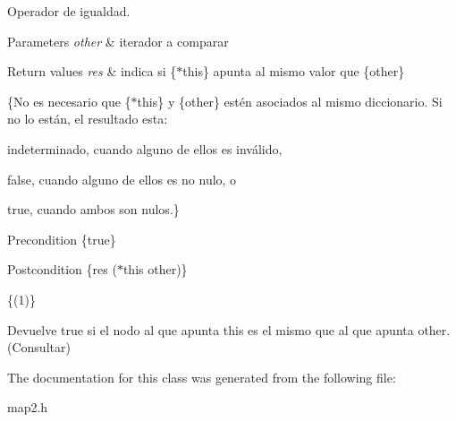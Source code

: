Operador de igualdad. 


\begin{DoxyParams}{Parameters}
{\em other} & iterador a comparar \\
\hline
\end{DoxyParams}

\begin{DoxyRetVals}{Return values}
{\em res} & indica si \{$\ast$this\} apunta al mismo valor que \{other\}\\
\hline
\end{DoxyRetVals}
\{No es necesario que \{$\ast$this\} y \{other\} estén asociados al mismo diccionario. Si no lo están, el resultado esta\+:
\begin{DoxyItemize}
\item indeterminado, cuando alguno de ellos es inválido,
\item false, cuando alguno de ellos es no nulo, o
\item true, cuando ambos son nulos.\}
\end{DoxyItemize}

\begin{DoxyPrecond}{Precondition}
\{true\} 
\end{DoxyPrecond}
\begin{DoxyPostcond}{Postcondition}
\{res  ($\ast$this  other)\}
\end{DoxyPostcond}
\{(1)\}

Devuelve true si el nodo al que apunta this es el mismo que al que apunta other. (Consultar) 

The documentation for this class was generated from the following file\+:\begin{DoxyCompactItemize}
\item 
map2.\+h\end{DoxyCompactItemize}
